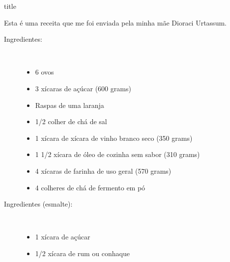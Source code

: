 \documentclass [11pt, letterpaper] {article}
\begin{document}
 {title}

Esta é uma receita que me foi enviada pela minha mãe Dioraci Urtassum.

\begin {description}
\item [Ingredientes:] \ \\
\begin {itemize}
\item 6 ovos
\item 3 xícaras de açúcar (600 grams)
\item Raspas de uma laranja
\item 1/2 colher de chá de sal
\item 1 xícara de xícara de vinho branco seco (350 grams)
\item 1 1/2 xícara de óleo de cozinha sem sabor (310 grams)
\item 4 xícaras de farinha de uso geral (570 grams)
\item 4 colheres de chá de fermento em pó
\end {itemize}

\item [Ingredientes (esmalte):] \ \\
\begin {itemize}
\item 1 xícara de açúcar
\item 1/2 xícara de rum ou conhaque
\end {itemize}


\end{description}
\end{document}
